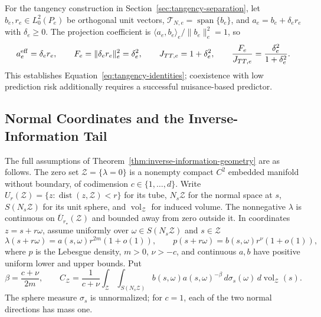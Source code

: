 For the tangency construction in Section~\ref{sec:tangency-separation}, let $b_e,r_e\in L_0^2(P_e)$ be orthogonal unit vectors, $\mathcal T_{N,e}=\operatorname{span}\{b_e\}$, and $a_e=b_e+\delta_er_e$ with $\delta_e\ge0$. The projection coefficient is $\langle a_e,b_e\rangle_e/\|b_e\|_e^2=1$, so
\begin{equation}
a_e^{\mathrm{eff}}=\delta_er_e,\qquad F_e=\|\delta_er_e\|_e^2=\delta_e^2,
\qquad J_{TT,e}=1+\delta_e^2,\qquad \frac{F_e}{J_{TT,e}}=\frac{\delta_e^2}{1+\delta_e^2}.
\label{eq:app-tangency-identities}
\end{equation}
This establishes Equation~\eqref{eq:tangency-identities}; coexistence with low prediction risk additionally requires a successful nuisance-based predictor.

\subsection{Normal Coordinates and the Inverse-Information Tail}
\label{app:theory-tails}

The full assumptions of Theorem~\ref{thm:inverse-information-geometry} are as follows. The zero set $\mathcal Z=\{\lambda=0\}$ is a nonempty compact $C^2$ embedded manifold without boundary, of codimension $c\in\{1,\ldots,d\}$. Write $U_r(\mathcal Z)=\{z:\operatorname{dist}(z,\mathcal Z)<r\}$ for its tube, $N_s\mathcal Z$ for the normal space at $s$, $S(N_s\mathcal Z)$ for its unit sphere, and $\operatorname{vol}_{\mathcal Z}$ for induced volume. The nonnegative $\lambda$ is continuous on $\overline U_{r_\star}(\mathcal Z)$ and bounded away from zero outside it. In coordinates $z=s+r\omega$, assume uniformly over $\omega\in S(N_s\mathcal Z)$ and $s\in\mathcal Z$
\begin{equation}
\lambda(s+r\omega)=a(s,\omega)r^{2m}(1+o(1)),\qquad
p(s+r\omega)=b(s,\omega)r^\nu(1+o(1)),
\label{eq:null-set-expansions}
\end{equation}
where $p$ is the Lebesgue density, $m>0$, $\nu>-c$, and continuous $a,b$ have positive uniform lower and upper bounds. Put
\begin{equation}
\beta=\frac{c+\nu}{2m},\qquad
C_{\mathcal Z}=\frac1{c+\nu}\int_{\mathcal Z}\int_{S(N_s\mathcal Z)}
b(s,\omega)a(s,\omega)^{-\beta}\,d\sigma_s(\omega)\,d\operatorname{vol}_{\mathcal Z}(s).
\label{eq:app-tail-constant}
\end{equation}
The sphere measure $\sigma_s$ is unnormalized; for $c=1$, each of the two normal directions has mass one.

